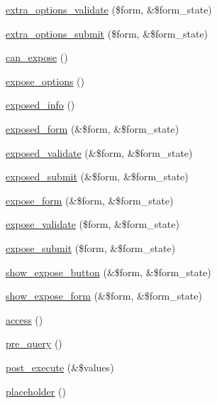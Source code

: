 \begin{DoxyCompactItemize}
\item 
\hyperlink{classviews__handler_a8a2c2fb295ec8024fc9e33361a92e8ac}{extra\_\-options\_\-validate} (\$form, \&\$form\_\-state)
\item 
\hyperlink{classviews__handler_aca642bf4dff25e0d49f7fca65bb97f77}{extra\_\-options\_\-submit} (\$form, \&\$form\_\-state)
\item 
\hyperlink{classviews__handler_a92517d122d69dc6f64a9edb80d55057d}{can\_\-expose} ()
\item 
\hyperlink{classviews__handler_a2db9f3127a5364b17fb775cede2f43a6}{expose\_\-options} ()
\item 
\hyperlink{classviews__handler_a2f16176116ecd86a8f8c60a2bc1ebd54}{exposed\_\-info} ()
\item 
\hyperlink{classviews__handler_a657fbb873c6be9e1da904e2aad191f66}{exposed\_\-form} (\&\$form, \&\$form\_\-state)
\item 
\hyperlink{classviews__handler_a2dd536754e4764cc82ffe7c864f54b16}{exposed\_\-validate} (\&\$form, \&\$form\_\-state)
\item 
\hyperlink{classviews__handler_a6b0a97cfe77b3f9dfcfad08f21f5c0f7}{exposed\_\-submit} (\&\$form, \&\$form\_\-state)
\item 
\hyperlink{classviews__handler_af462ac68a6853bed2a537a7fb908d807}{expose\_\-form} (\&\$form, \&\$form\_\-state)
\item 
\hyperlink{classviews__handler_a6590edeadc036c3db0e64baa2383909e}{expose\_\-validate} (\$form, \&\$form\_\-state)
\item 
\hyperlink{classviews__handler_a5f15ebff11663447d514247c2ce7744a}{expose\_\-submit} (\$form, \&\$form\_\-state)
\item 
\hyperlink{classviews__handler_af519db20125fb4d1c0f7401692dcef0c}{show\_\-expose\_\-button} (\&\$form, \&\$form\_\-state)
\item 
\hyperlink{classviews__handler_ad2be656c724d87d3b9f9c66392ab88f9}{show\_\-expose\_\-form} (\&\$form, \&\$form\_\-state)
\item 
\hyperlink{classviews__handler_a3f2fbfe1e0849d06ae77149412b821f6}{access} ()
\item 
\hyperlink{classviews__handler_a4eeb5551d6c97b1ea074049991989fce}{pre\_\-query} ()
\item 
\hyperlink{classviews__handler_a78896f02cc58523ccc369d242d92c6a1}{post\_\-execute} (\&\$values)
\item 
\hyperlink{classviews__handler_a15612d3988a648de68e0b3629feebcd7}{placeholder} ()
\item 

\end{DoxyCompactItemize}
